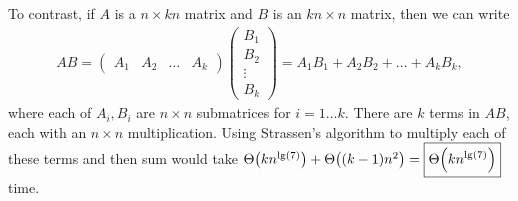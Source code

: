 \documentclass[Chapter04]{subfiles}
\begin{document}
\begin{enumerate}
\begin{answer}
			To contrast, if $A$ is a $n \times kn$ matrix and $B$ is an $kn \times n$ matrix, then we can write
			\begin{align*}
				AB =
				\begin{pmatrix}
					A_1 & A_2 & \dots & A_k
				\end{pmatrix}
				\begin{pmatrix}
					B_1\\
					B_2\\
					\vdots\\
					B_k
				\end{pmatrix}
				= A_1B_1 + A_2B_2 + \dots + A_kB_k,
			\end{align*}
			where each of $A_i,B_i$ are $n \times n$ submatrices for $i = 1 \dots k$. There are $k$ terms in $AB$, each with an $n \times n$ multiplication. Using Strassen's algorithm to multiply each of these terms and then sum would take $\Theta \qty(kn^{\lg(7)}) + \Theta \qty((k - 1)n^2) = \boxed{\Theta \qty(kn^{\lg(7)})}$ time.
		\end{answer}


\end{enumerate}
\end{document}
